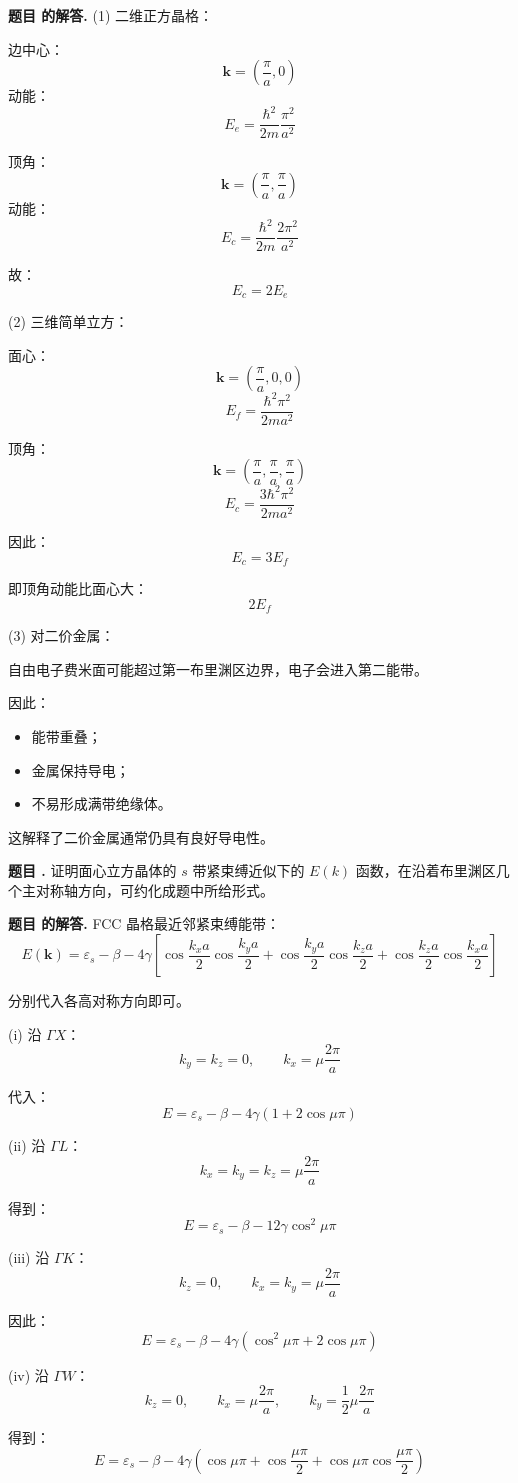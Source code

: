 \documentclass[12pt, a4paper, oneside]{ctexart}
\newcounter{problemname}
\newenvironment{problem}
  {\begin{shaded}\stepcounter{problemname}\par\noindent\textbf{题目 \theproblemname. }}
  {\end{shaded}\par}
\newenvironment{solution}
  {\par\noindent\textbf{题目 \theproblemname 的解答. }}
  {\par}
\begin{document}
\begin{solution}
(1) 二维正方晶格：

边中心：
\[
\mathbf k=
\left(
\frac{\pi}{a},0
\right)
\]
动能：
\[
E_e
=
\frac{\hbar^2}{2m}
\frac{\pi^2}{a^2}
\]

顶角：
\[
\mathbf k=
\left(
\frac{\pi}{a},
\frac{\pi}{a}
\right)
\]
动能：
\[
E_c
=
\frac{\hbar^2}{2m}
\frac{2\pi^2}{a^2}
\]

故：
\[
\boxed{
E_c=2E_e
}
\]

(2) 三维简单立方：

面心：
\[
\mathbf k=
\left(
\frac{\pi}{a},
0,
0
\right)
\]
\[
E_f=\frac{\hbar^2\pi^2}{2ma^2}
\]

顶角：
\[
\mathbf k=
\left(
\frac{\pi}{a},
\frac{\pi}{a},
\frac{\pi}{a}
\right)
\]
\[
E_c
=
\frac{3\hbar^2\pi^2}{2ma^2}
\]

因此：
\[
\boxed{
E_c=3E_f
}
\]

即顶角动能比面心大：
\[
\boxed{
2E_f
}
\]

(3) 对二价金属：

自由电子费米面可能超过第一布里渊区边界，电子会进入第二能带。

因此：

\begin{itemize}
\item 能带重叠；
\item 金属保持导电；
\item 不易形成满带绝缘体。
\end{itemize}

这解释了二价金属通常仍具有良好导电性。
\end{solution}

\begin{problem}
证明面心立方晶体的 $s$ 带紧束缚近似下的 $E(k)$ 函数，在沿着布里渊区几个主对称轴方向，可约化成题中所给形式。
\end{problem}

\begin{solution}
FCC 晶格最近邻紧束缚能带：
\[
E(\mathbf k)
=
\varepsilon_s-\beta
-4\gamma
\left[
\cos\frac{k_xa}{2}\cos\frac{k_ya}{2}
+\cos\frac{k_ya}{2}\cos\frac{k_za}{2}
+\cos\frac{k_za}{2}\cos\frac{k_xa}{2}
\right]
\]

分别代入各高对称方向即可。

(i) 沿 $\Gamma X$：
\[
k_y=k_z=0,
\qquad
k_x=\mu\frac{2\pi}{a}
\]

代入：
\[
\boxed{
E
=
\varepsilon_s-\beta
-4\gamma(1+2\cos\mu\pi)
}
\]

(ii) 沿 $\Gamma L$：
\[
k_x=k_y=k_z=\mu\frac{2\pi}{a}
\]

得到：
\[
\boxed{
E
=
\varepsilon_s-\beta
-12\gamma\cos^2\mu\pi
}
\]

(iii) 沿 $\Gamma K$：
\[
k_z=0,
\qquad
k_x=k_y=\mu\frac{2\pi}{a}
\]

因此：
\[
\boxed{
E
=
\varepsilon_s-\beta
-4\gamma
(\cos^2\mu\pi+2\cos\mu\pi)
}
\]

(iv) 沿 $\Gamma W$：
\[
k_z=0,
\qquad
k_x=\mu\frac{2\pi}{a},
\qquad
k_y=\frac12\mu\frac{2\pi}{a}
\]

得到：
\[
\boxed{
E
=
\varepsilon_s-\beta
-4\gamma
\left(
\cos\mu\pi
+
\cos\frac{\mu\pi}{2}
+
\cos\mu\pi\cos\frac{\mu\pi}{2}
\right)
}
\]
\end{solution}
\end{document}
